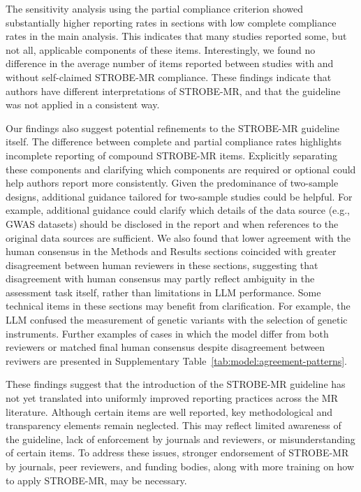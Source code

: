 The sensitivity analysis using the partial compliance criterion showed substantially higher reporting rates in sections with low complete compliance rates in the main analysis. This indicates that many studies reported some, but not all, applicable components of these items. Interestingly, we found no difference in the average number of items reported between studies with and without self-claimed STROBE-MR compliance. These findings indicate that authors have different interpretations of STROBE-MR, and that the guideline was not applied in a consistent way.

Our findings also suggest potential refinements to the STROBE-MR guideline itself. The difference between complete and partial compliance rates highlights incomplete reporting of compound STROBE-MR items. Explicitly separating these components and clarifying which components are required or optional could help authors report more consistently. Given the predominance of two-sample designs, additional guidance tailored for two-sample studies could be helpful. For example, additional guidance could clarify which details of the data source (e.g., GWAS datasets) should be disclosed in the report and when references to the original data sources are sufficient. We also found that lower agreement with the human consensus in the Methods and Results sections coincided with greater disagreement between human reviewers in these sections, suggesting that disagreement with human consensus may partly reflect ambiguity in the assessment task itself, rather than limitations in LLM performance. Some technical items in these sections may benefit from clarification. For example, the LLM confused the measurement of genetic variants with the selection of genetic instruments. Further examples of cases in which the model differ from both reviewers or matched final human consensus despite disagreement between reviwers are presented in Supplementary Table~\ref{tab:model:agreement-patterns}.

These findings suggest that the introduction of the STROBE-MR guideline has not yet translated into uniformly improved reporting practices across the MR literature. Although certain items are well reported, key methodological and transparency elements remain neglected. This may reflect limited awareness of the guideline, lack of enforcement by journals and reviewers, or misunderstanding of certain items. To address these issues, stronger endorsement of STROBE-MR by journals, peer reviewers, and funding bodies, along with more training on how to apply STROBE-MR, may be necessary.

